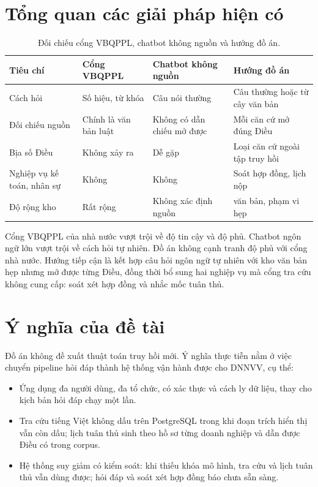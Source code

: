 \section{Tổng quan các giải pháp hiện có}

\begin{table}[htp]
\centering
\caption{Đối chiếu cổng VBQPPL, chatbot không nguồn và hướng đồ án.}
\label{tab:khao-sat}
\begin{tabular}{p{2.8cm}p{3.6cm}p{3.6cm}p{3.8cm}}
\toprule
\textbf{Tiêu chí} & \textbf{Cổng VBQPPL} & \textbf{Chatbot không nguồn} &
\textbf{Hướng đồ án} \\
\midrule
Cách hỏi & Số hiệu, từ khóa & Câu nói thường & Câu thường hoặc từ cây văn bản \\
Đối chiếu nguồn & Chính là văn bản luật & Không có dẫn chiếu mở được & Mỗi căn cứ
mở đúng Điều \\
Bịa số Điều & Không xảy ra & Dễ gặp & Loại căn cứ ngoài tập truy hồi \\
Nghiệp vụ kế toán, nhân sự & Không & Không & Soát hợp đồng, lịch nộp \\
Độ rộng kho & Rất rộng & Không xác định nguồn & \soLuat{} văn bản, phạm vi hẹp \\
\bottomrule
\end{tabular}
\end{table}

Cổng VBQPPL của nhà nước vượt trội về độ tin cậy và độ phủ. Chatbot ngôn ngữ lớn
vượt trội về cách hỏi tự nhiên. Đồ án không cạnh tranh độ phủ với cổng nhà nước.
Hướng tiếp cận là kết hợp câu hỏi ngôn ngữ tự nhiên với kho văn bản hẹp nhưng mở
được từng Điều, đồng thời bổ sung hai nghiệp vụ mà cổng tra cứu không cung cấp:
soát xét hợp đồng và nhắc mốc tuân thủ.

\section{Ý nghĩa của đề tài}

Đồ án không đề xuất thuật toán truy hồi mới. Ý nghĩa thực tiễn nằm ở việc chuyển
pipeline hỏi đáp thành hệ thống vận hành được cho DNNVV, cụ thể:

\begin{itemize}
    \item Ứng dụng đa người dùng, đa tổ chức, có xác thực và cách ly dữ liệu,
    thay cho kịch bản hỏi đáp chạy một lần.
    \item Tra cứu tiếng Việt không dấu trên PostgreSQL trong khi đoạn trích hiển
    thị vẫn còn dấu; lịch tuân thủ sinh theo hồ sơ từng doanh nghiệp và dẫn được
    Điều có trong corpus.
    \item Hệ thống suy giảm có kiểm soát: khi thiếu khóa mô hình, tra cứu và lịch
    tuân thủ vẫn dùng được; hỏi đáp và soát xét hợp đồng báo chưa sẵn sàng.
\end{itemize}

